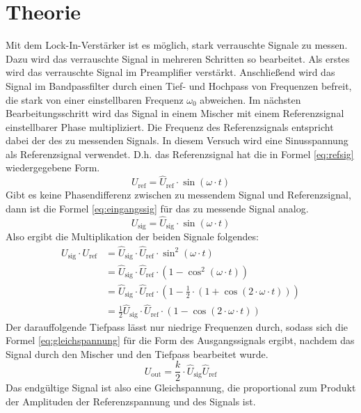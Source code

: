 
\section{Theorie}
Mit dem Lock-In-Verstärker ist es möglich, stark verrauschte Signale zu
messen.  Dazu wird das verrauschte Signal in mehreren Schritten so
bearbeitet. Als erstes wird das verrauschte Signal im Preamplifier
verstärkt. Anschließend wird das Signal im Bandpassfilter durch einen
Tief- und Hochpass von Frequenzen befreit, die stark von einer
einstellbaren Frequenz $\omega_0$ abweichen.  Im nächsten
Bearbeitungsschritt wird das Signal in einem Mischer mit einem
Referenzsignal einstellbarer Phase multipliziert. Die Frequenz des
Referenzsignals entspricht dabei der des zu messenden Signals.  In
diesem Versuch wird eine Sinusspannung als Referenzsignal
verwendet. D.h. das Referenzsignal hat die in Formel \eqref{eq:refsig}
wiedergegebene Form.
%
\begin{equation}
  \label{eq:refsig}
  U_\text{ref} = \widehat{U}_\text{ref} \cdot \sin(\omega \cdot t)
\end{equation}
%
Gibt es keine Phasendifferenz zwischen zu messendem Signal und
Referenzsignal, dann ist die Formel \eqref{eq:eingangssig} für das zu
messende Signal analog.
%
\begin{equation}
  \label{eq:eingangssig}
  U_\text{sig} = \widehat{U}_\text{sig} \cdot \sin(\omega \cdot t)
\end{equation}
%
Also ergibt die Multiplikation der beiden Signale folgendes:
%
\begin{equation*}
  \begin{split}
    U_\text{sig} \cdot U_\text{ref}
    &= \widehat{U}_\text{sig}\cdot \widehat{U}_\text{ref}\cdot
    \sin^2(\omega \cdot t) \\
    &= \widehat{U}_\text{sig} \cdot \widehat{U}_\text{ref}
    \cdot (1 - \cos^2(\omega \cdot t)) \\
    &= \widehat{U}_\text{sig} \cdot \widehat{U}_\text{ref} \cdot (1 -
    \frac{1}{2} \cdot (1 +
    \cos(2\cdot \omega \cdot t)))\\
    &= \frac{1}{2} \widehat{U}_\text{sig} \cdot \widehat{U}_\text{ref}
    \cdot(1 - \cos(2\cdot \omega\cdot t))
  \end{split}
\end{equation*}
%
Der darauffolgende Tiefpass lässt nur niedrige Frequenzen durch, sodass
sich die Formel \eqref{eq:gleichspannung} für die Form des
Ausgangssignals ergibt, nachdem das Signal durch den Mischer und den
Tiefpass bearbeitet wurde.
%
\begin{equation}
  \label{eq:gleichspannung}
  U_\text{out} = \frac{k}{2} \cdot \widehat{U}_\text{sig} \widehat{U}_\text{ref}
\end{equation}
%
Das endgültige Signal ist also eine Gleichspannung, die proportional zum
Produkt der Amplituden der Referenzspannung und des Signals ist.
